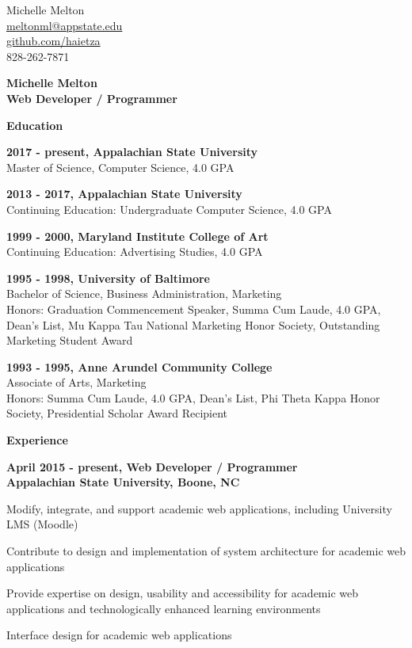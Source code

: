 \documentclass[letterpaper,10pt,final]{memoir}
\newcommand{\Sep}{\vspace{1.5em}}
\newcommand{\SmallSep}{\vspace{0.5em}}
\newcommand{\CVSection}[1]
	{\Large\textbf{#1}\par
	\SmallSep\normalsize\normalfont}
\newcommand{\CVItem}[1]
	{\textbf{\color{BrickRed} #1}}
\begin{document}
\begin{flushright}\small
	Michelle Melton\\
	\url{meltonml@appstate.edu}\\
	\url{github.com/haietza}\\
	828-262-7871
\end{flushright}\normalsize
\framebreak


\Huge\bfseries {\color{BrickRed} Michelle Melton}\\
\Large\bfseries  Web Developer / Programmer\\

\normalsize\normalfont

\CVSection{Education}
\CVItem{2017 - present, Appalachian State University}\\
Master of Science, Computer Science, 4.0 GPA
\SmallSep

\CVItem{2013 - 2017, Appalachian State University}\\
Continuing Education: Undergraduate Computer Science, 4.0 GPA
\SmallSep

\CVItem{1999 - 2000, Maryland Institute College of Art}\\
Continuing Education: Advertising Studies, 4.0 GPA
\SmallSep

\CVItem{1995 - 1998, University of Baltimore}\\
Bachelor of Science, Business Administration, Marketing\\
Honors: Graduation Commencement Speaker, Summa Cum Laude, 4.0 GPA, Dean's List, Mu Kappa Tau National Marketing Honor Society, Outstanding Marketing Student Award
\SmallSep

\CVItem{1993 - 1995, Anne Arundel Community College}\\
Associate of Arts, Marketing\\
Honors: Summa Cum Laude, 4.0 GPA, Dean's List, Phi Theta Kappa Honor Society, Presidential Scholar Award Recipient
\Sep

\CVSection{Experience}
\CVItem{April 2015 - present, Web Developer / Programmer\\
Appalachian State University, Boone, NC}
\begin{compactitem}[\color{BrickRed}$\circ$]
	\item Modify, integrate, and support academic web applications, including University LMS (Moodle)
	\item Contribute to design and implementation of system architecture for academic web applications
	\item Provide expertise on design, usability and accessibility for academic web applications and technologically enhanced learning environments
	\item Interface design for academic web applications
\end{compactitem}
\Sep
\end{document}
